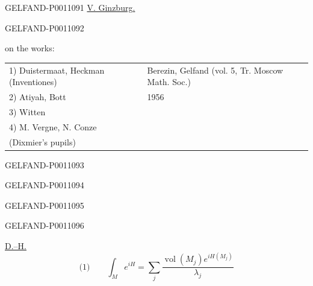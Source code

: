 \begin{GelfandAdjacentEvidence}{GELFAND-P001109}{1}
\underline{V. Ginzburg.}
\end{GelfandAdjacentEvidence}
\begin{GelfandAdjacentEvidence}{GELFAND-P001109}{2}


on the works:

\begin{center}
\begin{tabular}{@{}l|l@{}}
1) Duistermaat, Heckman (Inventiones) &
Berezin, Gelfand (vol. 5, Tr. Moscow Math. Soc.)\\
2) Atiyah, Bott & \hfill 1956\\
3) Witten & \\
4) M. Vergne, N. Conze & \\
\hspace{1em}(Dixmier’s pupils) &
\end{tabular}
\end{center}
\end{GelfandAdjacentEvidence}
\begin{GelfandAdjacentEvidence}{GELFAND-P001109}{3}

\end{GelfandAdjacentEvidence}
\begin{GelfandAdjacentEvidence}{GELFAND-P001109}{4}

\end{GelfandAdjacentEvidence}
\begin{GelfandAdjacentEvidence}{GELFAND-P001109}{5}

\end{GelfandAdjacentEvidence}
\begin{GelfandAdjacentEvidence}{GELFAND-P001109}{6}


\underline{D.–H.}
\[
\text{(1)}\qquad\int_M e^{iH}
=\sum_j\frac{\operatorname{vol}(M_j)e^{iH(M_j)}}{\lambda_j}
\]
\end{GelfandAdjacentEvidence}
